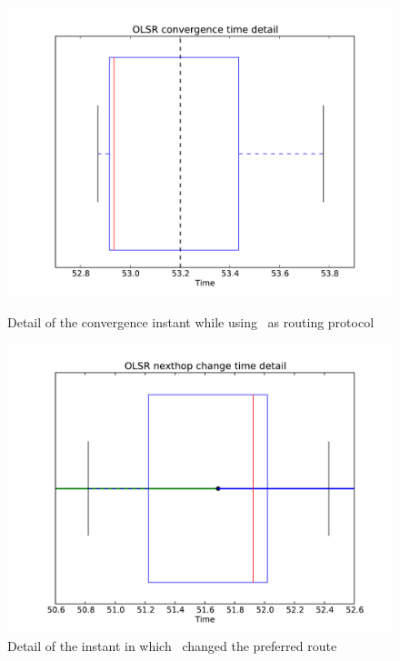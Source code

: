 \begin{figure}[bhtp]
  \begin{minipage}[b]{0.5\linewidth}
    \centering
    \includegraphics[width=\linewidth]{images/convergence_olsr_plot_convergence_time}
    \caption{Detail of the convergence instant while using \olsr\ as routing protocol}
    \label{pic:olsr_convergence_time}
  \end{minipage}
  \hspace{0.5cm}
  \begin{minipage}[b]{0.5\linewidth}
    \centering
    \includegraphics[width=\linewidth]{images/convergence_olsr_plot_nexthop_change}
    \caption{Detail of the instant in which \olsr\ changed the
                 preferred route}
    \label{pic:olsr_convergence_change}
  \end{minipage}
\end{figure}

